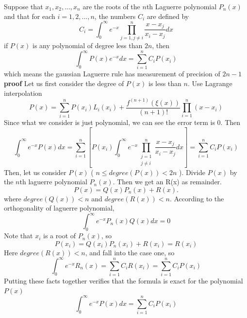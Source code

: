 \documentclass[
10pt, %
a4paper, %
oneside, %
headinclude,footinclude, %
BCOR5mm, %
]{scrartcl}
\theoremstyle{definition}
\begin{document}
Suppose that $x_1,x_2,...,x_n$ are the roots of the $n$th Laguerre polynomial $P_n(x)$ and that for each $i = 1,2,...,n$, the numbers $C_i$ are defined by \[
C_i=\int_{0}^{\infty}e^{-x}\prod\limits_{j=1,j\neq i}^{n}\frac{x-x_j}{x_i-x_j}dx
\]
if $P(x)$ is  any polynomial of degree less than $2n$, then
\[
\int_{0}^{\infty}{P(x)e^{-x}dx} = \sum\limits_{i=1}^{n}C_iP(x_i)
\]
which means the gaussian Laguerre rule has measurement of precision of $2n-1$
\\\textbf{proof}
Let us first consider the degree of  $P(x)$ is less than $ n$. Use Lagrange interpolation
\[
P(x) = \sum\limits_{i=1}^{n}P(x_i)L_i(x_i) + \frac{f^{(n+1)}(\xi(x))}{(n+1)!}\prod\limits_{i=1}^{n}(x-x_i)
\]
Since what we consider is just polynomial, we can see the error term is $0$. Then
\[
\int_{0}^{\infty}e^{-x}P(x)dx= \sum_{i=1}^{n}
{\left[
P(x_{i})\int_{0}^{\infty}e^{-x}\prod\limits_{
\begin{smallmatrix}
j =1 \\j\neq i
\end{smallmatrix}
}^{n}\frac{x-x_{j}}{x_{i}-x_{j}}dx
\right]
}
 = \sum\limits_{i=1}^{n}C_iP(x_i)
\]
Then, let us consider $P(x)$  ( $n \leq degree(P(x)) < 2n$ ). Divide $P(x)$ by the $n$th laguerre polynomial $P_n(x)$. Then we  get an R(x) as remainder. \[
P(x) = Q(x)P_n(x) + R(x).
\]
where $degree(Q(x)) < n$ and $ degree(R(x)) < n $.
According to the orthogonality  of laguerre polynomial,\[
\int_{0}^{\infty}e^{-x}P_n(x)Q(x)dx = 0
\]
Note that $x_i$ is a root of $P_n(x)$, so \[
P(x_i) = Q(x_i)P_n(x_i) + R(x_i) = R(x_i)
\]
Here $degree(R(x)) < n $, and fall into the case one, so
\[
\int_{0}^{\infty}e^{-x}R_n(x) = \sum\limits_{i=1}^{n}C_i R(x_i) = \sum\limits_{i=1}^{n}C_i P(x_i)
\]
Putting these facts together verifies that the formula is exact for the polynomial $P(x)$
\[
\int_{0}^{\infty}e^{-x}P(x)dx = \sum\limits_{i=1}^{n}C_i P(x_i)
\]
\end{document}
